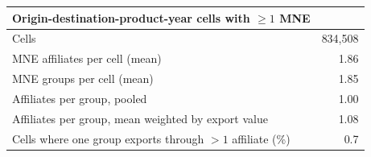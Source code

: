 \begin{tabular}{lr}
\toprule
Origin-destination-product-year cells with $\geq 1$ MNE & \\
\midrule
Cells & 834,508 \\
MNE affiliates per cell (mean) & 1.86 \\
MNE groups per cell (mean) & 1.85 \\
Affiliates per group, pooled & 1.00 \\
Affiliates per group, mean weighted by export value & 1.08 \\
Cells where one group exports through $>1$ affiliate (\%) & 0.7 \\
\bottomrule
\end{tabular}
